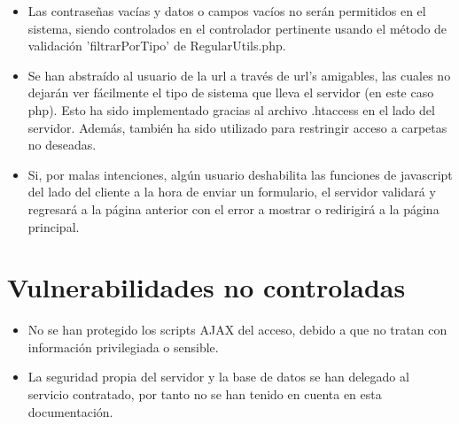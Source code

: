 \begin{itemize}
\item Las contrase\~{n}as vac\'{i}as y datos o campos vac\'{i}os no ser\'{a}n permitidos en el sistema, siendo controlados en el controlador pertinente usando el m\'{e}todo de validaci\'{o}n 'filtrarPorTipo' de RegularUtils.php.

\item Se han abstra\'{i}do al usuario de la url a trav\'{e}s de url's amigables, las cuales no dejar\'{a}n ver f\'{a}cilmente el tipo de sistema que lleva el servidor (en este caso php). Esto ha sido implementado gracias al archivo .htaccess en el lado del servidor. Adem\'{a}s, tambi\'{e}n ha sido utilizado para restringir acceso a carpetas no deseadas.

\item Si, por malas intenciones, alg\'{u}n usuario deshabilita las funciones de javascript del lado del cliente a la hora de enviar un formulario, el servidor validará y regresará a la página anterior con el error a mostrar o redirigirá a la página principal.

\end{itemize}
\section{Vulnerabilidades no controladas}

\begin{itemize}
\item No se han protegido los scripts AJAX del acceso, debido a que no tratan con informaci\'{o}n privilegiada o sensible.
\item La seguridad propia del servidor y la base de datos se han delegado al servicio contratado, por tanto no se han tenido en cuenta en esta documentaci\'{o}n.
\end{itemize}



